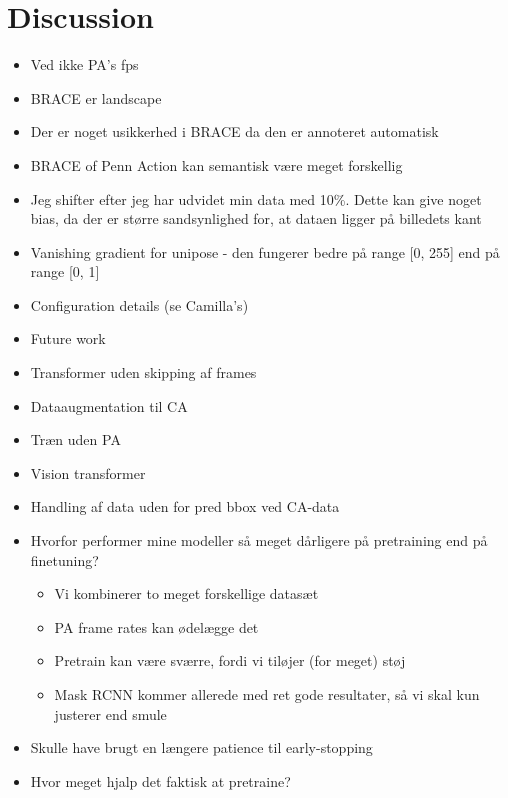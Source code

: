 \documentclass[./main.tex]{subfiles}
\begin{document}
\section{Discussion}
\begin{itemize}
    \item Ved ikke PA's fps
    \item BRACE er landscape
    \item Der er noget usikkerhed i BRACE da den er annoteret automatisk
    \item BRACE of Penn Action kan semantisk være meget forskellig
    \item Jeg shifter efter jeg har udvidet min data med 10\%. Dette kan give noget bias, da der er større sandsynlighed for, at dataen ligger på billedets kant
    \item Vanishing gradient for unipose - den fungerer bedre på range [0, 255] end på range [0, 1]
    \item Configuration details (se Camilla's)
    \item Future work
        \item Transformer uden skipping af frames 
        \item Dataaugmentation til CA
        \item Træn uden PA
        \item Vision transformer
    \item Handling af data uden for pred bbox ved CA-data
    \item Hvorfor performer mine modeller så meget dårligere på pretraining end på finetuning?
    \begin{itemize}
        \item Vi kombinerer to meget forskellige datasæt
        \item PA frame rates kan ødelægge det
        \item Pretrain kan være sværre, fordi vi tiløjer (for meget) støj
        \item Mask RCNN kommer allerede med ret gode resultater, så vi skal kun justerer end smule
    \end{itemize}
    \item Skulle have brugt en længere patience til early-stopping
    \item Hvor meget hjalp det faktisk at pretraine?
\end{itemize}
\end{document}
